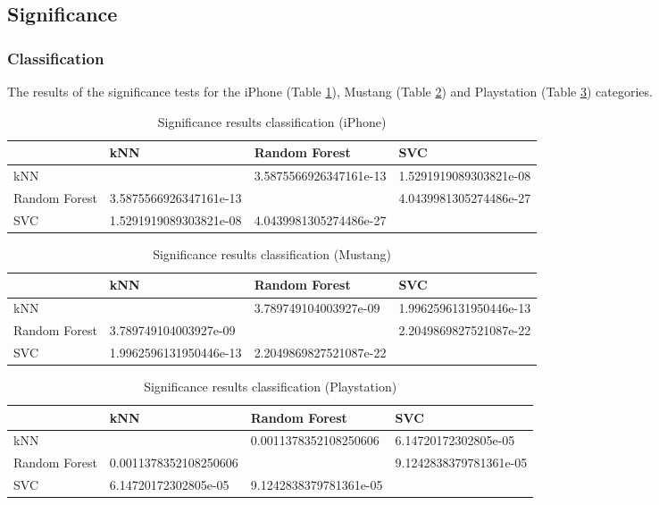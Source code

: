 \subsection{Significance}
\subsubsection{Classification}
The results of the significance tests for the iPhone (Table \ref{tab_sig_class_iphone}), Mustang (Table \ref{tab_sig_class_mustang}) and Playstation (Table \ref{tab_sig_class_playstation}) categories.
\begin{table}[h]
	\begin{center}
	\begin{tabular}{| p{2.65cm} || p{3.45cm} | p{3.45cm} | p{3.45cm} |}
		\hline
		& kNN & Random Forest & SVC \\
		\hline \hline
		kNN & & 3.5875566926347161e-13 & 1.5291919089303821e-08 \\
		\hline
		Random Forest & 3.5875566926347161e-13 & & 4.0439981305274486e-27 \\
		\hline
		SVC & 1.5291919089303821e-08 & 4.0439981305274486e-27 & \\
		\hline
	\end{tabular}
	\end{center}
	\caption{Significance results classification (iPhone)}
	\label{tab_sig_class_iphone}
\end{table}
\begin{table}[h]
	\begin{center}
	\begin{tabular}{| p{2.65cm} || p{3.45cm} | p{3.45cm} | p{3.45cm} |}
		\hline
		& kNN & Random Forest & SVC \\
		\hline \hline
		kNN & & 3.789749104003927e-09 & 1.9962596131950446e-13 \\
		\hline
		Random Forest & 3.789749104003927e-09 & & 2.2049869827521087e-22 \\
		\hline
		SVC & 1.9962596131950446e-13 & 2.2049869827521087e-22 & \\
		\hline
	\end{tabular}
	\end{center}
	\caption{Significance results classification (Mustang)}
	\label{tab_sig_class_mustang}
\end{table}
\begin{table}[h]
	\begin{center}
	\begin{tabular}{| p{2.65cm} || p{3.45cm} | p{3.45cm} | p{3.45cm} |}
		\hline
		& kNN & Random Forest & SVC \\
		\hline \hline
		kNN & & 0.0011378352108250606 & 6.14720172302805e-05 \\
		\hline
		Random Forest & 0.0011378352108250606 & & 9.1242838379781361e-05 \\
		\hline
		SVC & 6.14720172302805e-05 & 9.1242838379781361e-05 & \\
		\hline
	\end{tabular}
	\end{center}
	\caption{Significance results classification (Playstation)}
	\label{tab_sig_class_playstation}
\end{table}
